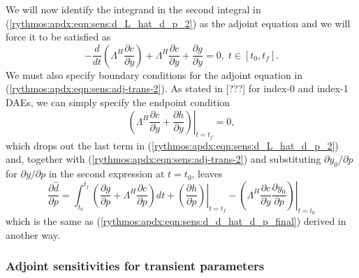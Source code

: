 \documentclass[pdf,ps2pdf,11pt]{SANDreport}
\begin{document}
%
We will now identify the integrand in the second integral in
(\ref{rythmos:apdx:eqn:sens:d_L_hat_d_p_2}) as the adjoint equation and we
will force it to be satisfied as
%
\begin{equation}
- \frac{d}{dt}\left( \Lambda^H \frac{\partial c}{\partial \dot{y}} \right)
+  \Lambda^H \frac{\partial c}{\partial y} +  \frac{\partial g}{\partial y} = 0, \; t \in \left[ t_0, t_f \right].
\label{rythmos:apdx:eqn:sens:adj-trans-2}
\end{equation}
%
We must also specify boundary conditions for the adjoint equation in
(\ref{rythmos:apdx:eqn:sens:adj-trans-2}).  As stated in [???] for index-0 and
index-1 DAEs, we can simply specify the endpoint condition
%
\begin{equation}
\left. \left(
  \Lambda^H \frac{\partial c}{\partial \dot{y}}
  +  \frac{\partial h}{\partial y}
\right) \right|_{t=t_f}
 = 0,
\label{rythmos:apdx:eqn:sens:adj-trans:fc-2}
\end{equation}
%
which drops out the last term in (\ref{rythmos:apdx:eqn:sens:d_L_hat_d_p_2})
and, together with (\ref{rythmos:apdx:eqn:sens:adj-trans-2}) and substituting
$\partial y_0 / {}\partial p$ for $\partial y / {}\partial p$ in the second
expression at $t=t_0$, leaves
%
\begin{equation}
\frac{\partial \hat{d}}{\partial p} =
\int_{t_0}^{t_f} \left(
    \frac{\partial g}{\partial p}
    + \Lambda^H \frac{\partial c}{\partial p}
  \right) dt
  + \left. \left( \frac{\partial h}{\partial p} \right) \right|_{t=t_f}
  - \left. \left( \Lambda^H \frac{\partial c}{\partial \dot{y}} \frac{\partial y_0}{\partial p} \right) \right|_{t=t_0}
\label{rythmos:apdx:eqn:sens:d_d_hat_d_p_final-2}
\end{equation}
%
which is the same as (\ref{rythmos:apdx:eqn:sens:d_d_hat_d_p_final}) derived
in another way.

\subsubsection{Adjoint sensitivities for transient parameters}
\end{document}
